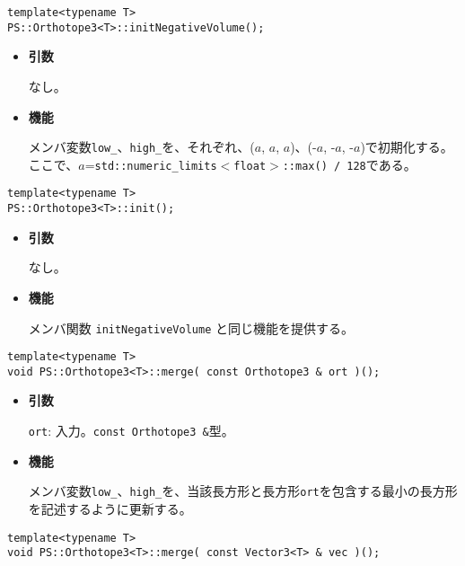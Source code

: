 \begin{screen}
\begin{verbatim}
template<typename T>
PS::Orthotope3<T>::initNegativeVolume();
\end{verbatim}
\end{screen}

\begin{itemize}

\item{{\bf 引数}}

なし。

\item{{\bf 機能}}

メンバ変数\texttt{low\_}、\texttt{high\_}を、それぞれ、($a$, $a$, $a$)、(-$a$, -$a$, -$a$)で初期化する。
ここで、$a$=\texttt{std::numeric\_limits$<$float$>$::max() / 128}である。

\end{itemize}

\begin{screen}
\begin{verbatim}
template<typename T>
PS::Orthotope3<T>::init();
\end{verbatim}
\end{screen}

\begin{itemize}

\item{{\bf 引数}}

なし。

\item{{\bf 機能}}

メンバ関数 \texttt{initNegativeVolume} と同じ機能を提供する。

\end{itemize}

\begin{screen}
\begin{verbatim}
template<typename T>
void PS::Orthotope3<T>::merge( const Orthotope3 & ort )();
\end{verbatim}
\end{screen}

\begin{itemize}

\item{{\bf 引数}}

\texttt{ort}: 入力。\texttt{const Orthotope3 \&}型。

\item{{\bf 機能}}

メンバ変数\texttt{low\_}、\texttt{high\_}を、当該長方形と長方形\texttt{ort}を包含する最小の長方形を記述するように更新する。

\end{itemize}
\begin{screen}
\begin{verbatim}
template<typename T>
void PS::Orthotope3<T>::merge( const Vector3<T> & vec )();
\end{verbatim}
\end{screen}

